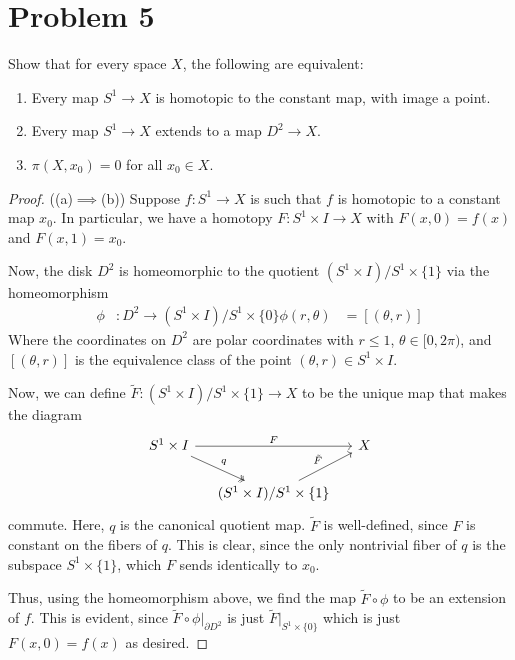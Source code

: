 \documentclass[fontsize=11pt]{scrartcl} %
\numberwithin{equation}{section} %
\numberwithin{figure}{section} %
\numberwithin{table}{section} %
\begin{document}
\newpage

\section*{Problem 5}
Show that for every space $X$, the following are equivalent:
\begin{enumerate}[label=(\alph*)]
    \item Every map $S^1\to X$ is homotopic to the constant map, with image a
        point.
    \item Every map $S^1\to X$ extends to a map $D^2\to X$.
    \item $\pi(X,x_0) = 0$ for all $x_0\in X$.
\end{enumerate}

\begin{proof}
    ((a)$\implies$(b))
    Suppose $f:S^1\to X$ is such that $f$ is homotopic to a constant map $x_0$.
    In particular, we have a homotopy $F:S^1\times I\to X$ with $F(x,0) = f(x)$
    and $F(x,1)=x_0$.

    Now, the disk $D^2$ is homeomorphic to the quotient $(S^1\times I)/{S^1\times
    \{1\}}$ via the homeomorphism 
    \[
        \begin{aligned}
            \phi&:D^2\to (S^1\times I)/{S^1\times\{0\}}
            \phi(r,\theta) &= [(\theta,r)]
        \end{aligned}
    \]
    Where the coordinates on $D^2$ are polar coordinates with $r \leq 1$,
    $\theta\in[0,2\pi)$, and $[(\theta,r)]$ is the equivalence class of the
    point $(\theta,r)\in S^1\times I$.

    Now, we can define $\tilde{F}:(S^1\times I)/{S^1\times \{1\}}\to X$ to be the
    unique map that makes the diagram
    \[
        \begin{tikzcd}[column sep=small]
            S^1\times I\arrow{rr}{F}\arrow[two heads]{rd}{q} &&X\\
            & (S^1\times I)/{S^1\times\{1\}}\arrow{ur}{\tilde{F}}
        \end{tikzcd}
    \]
    commute. Here, $q$ is the canonical quotient map. $\tilde{F}$ is
    well-defined, since $F$ is constant on the fibers of $q$. This is clear,
    since the only nontrivial fiber of $q$ is the subspace $S^1\times\{1\}$,
    which $F$ sends identically to $x_0$.

    Thus, using the homeomorphism above, we find the map $\tilde{F}\circ\phi$ to
    be an extension of $f$. This is evident, since
    $\tilde{F}\circ\phi|_{\partial D^2}$ is just $\tilde{F}|_{S^1\times\{0\}}$
    which is just $F(x,0)=f(x)$ as desired.


\end{proof}
\end{document}
